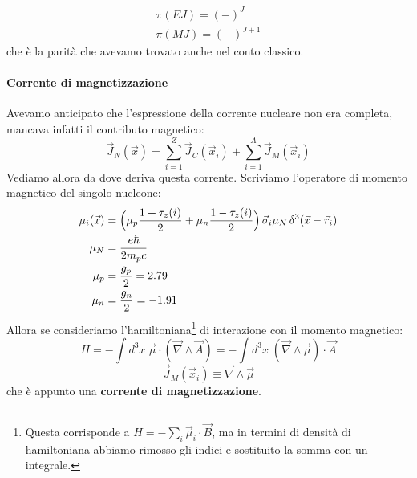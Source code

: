 \begin{displaymath}
\begin{array}{l}
    \pi(EJ) = (-)^J \\
    \pi(MJ) = (-)^{J+1}  
\end{array}
\end{displaymath}
che è la parità che avevamo trovato anche nel conto classico.

\paragraph{Corrente di magnetizzazione} Avevamo anticipato che l'espressione della corrente nucleare non era completa, mancava infatti il contributo magnetico:
$$\vec{J}_N(\vec{x}) = \sum_{i=1}^Z \vec{J}_C(\vec{x}_i) + \sum_{i=1}^A \vec{J}_M (\vec{x}_i)$$
Vediamo allora da dove deriva questa corrente. Scriviamo l'operatore di momento magnetico del singolo nucleone:
\begin{displaymath}
\begin{aligned}
\mu_i (\vec{x}) &= \Bigl ( \mu_p \frac{1+\tau_z(i)}{2} + \mu_n \frac{1-\tau_z(i)}{2} \Bigr )\, \vec{\sigma}_i \mu_N \, \delta^3(\vec{x}-\vec{r}_i) \\
\mu_N &= \frac{e\hbar}{2m_pc} \\
\mu_p &= \frac{g_p}{2} = 2.79 \\
\mu_n &= \frac{g_n}{2} = -1.91
\end{aligned}
\end{displaymath}
Allora se consideriamo l'hamiltoniana\footnote{Questa corrisponde a $H = -\sum_i \vec{\mu}_i \cdot \vec{B}$, ma in termini di densità di hamiltoniana abbiamo rimosso gli indici e sostituito la somma con un integrale.} di interazione con il momento magnetico:
$$H = -\int d^3x \; \vec{\mu}\cdot(\vec{\nabla}\land \vec{A}) = -\int d^3x \; (\vec{\nabla}\land\vec{\mu})\cdot \vec{A} $$
$$\vec{J}_M (\vec{x}_i) \equiv \vec{\nabla}\land\vec{\mu}$$
che è appunto una \textbf{corrente di magnetizzazione}.